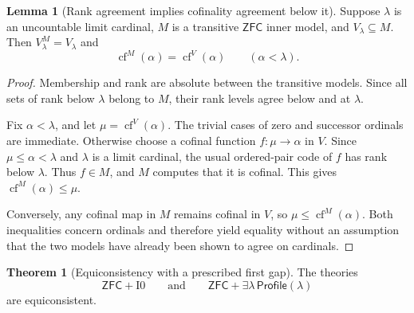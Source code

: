 \documentclass[11pt,letterpaper]{article}
\theoremstyle{definition}
\newtheorem{theorem}[definition]{Theorem}
\newtheorem{lemma}[definition]{Lemma}
\newcommand{\ZFC}{\mathsf{ZFC}}
\newcommand{\cf}{\operatorname{cf}}
\newcommand{\Izero}{\mathrm{I0}}
\newcommand{\Profile}{\mathsf{Profile}}
\begin{document}
\begin{lemma}[Rank agreement implies cofinality agreement below it]\label{lem:rankcf}
Suppose $\lambda$ is an uncountable limit cardinal, $M$ is a transitive $\ZFC$ inner model, and $V_\lambda\subseteq M$. Then $V_\lambda^M=V_\lambda$ and
\[
           \cf^M(\alpha)=\cf^V(\alpha)\qquad(\alpha<\lambda).
\]
\end{lemma}

\begin{proof}
Membership and rank are absolute between the transitive models. Since all sets of rank below $\lambda$ belong to $M$, their rank levels agree below and at $\lambda$.

Fix $\alpha<\lambda$, and let $\mu=\cf^V(\alpha)$. The trivial cases of zero and successor ordinals are immediate. Otherwise choose a cofinal function $f:\mu\to\alpha$ in $V$. Since $\mu\leq\alpha<\lambda$ and $\lambda$ is a limit cardinal, the usual ordered-pair code of $f$ has rank below $\lambda$. Thus $f\in M$, and $M$ computes that it is cofinal. This gives $\cf^M(\alpha)\leq\mu$.

Conversely, any cofinal map in $M$ remains cofinal in $V$, so $\mu\leq\cf^M(\alpha)$. Both inequalities concern ordinals and therefore yield equality without an assumption that the two models have already been shown to agree on cardinals.
\end{proof}

\begin{theorem}[Equiconsistency with a prescribed first gap]\label{thm:profile}
The theories
\[
       \ZFC+\Izero
       \qquad\text{and}\qquad
       \ZFC+\exists\lambda\,\Profile(\lambda)
\]
are equiconsistent.
\end{theorem}
\end{document}
